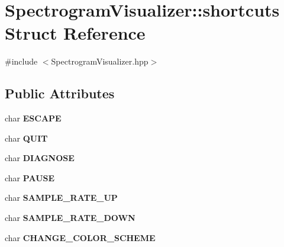 \hypertarget{structSpectrogramVisualizer_1_1shortcuts}{}\section{Spectrogram\+Visualizer\+:\+:shortcuts Struct Reference}
\label{structSpectrogramVisualizer_1_1shortcuts}


{\ttfamily \#include $<$Spectrogram\+Visualizer.\+hpp$>$}

\subsection*{Public Attributes}
\begin{DoxyCompactItemize}
\item 
\hypertarget{structSpectrogramVisualizer_1_1shortcuts_a3c916b79eb5fdbc9261962946104b26f}{}\label{structSpectrogramVisualizer_1_1shortcuts_a3c916b79eb5fdbc9261962946104b26f} 
char {\bfseries E\+S\+C\+A\+PE}
\item 
\hypertarget{structSpectrogramVisualizer_1_1shortcuts_a2ce860bc091bea9e78da24cd5691c4b4}{}\label{structSpectrogramVisualizer_1_1shortcuts_a2ce860bc091bea9e78da24cd5691c4b4} 
char {\bfseries Q\+U\+IT}
\item 
\hypertarget{structSpectrogramVisualizer_1_1shortcuts_a260568371342c5408ebb130ffa09cb33}{}\label{structSpectrogramVisualizer_1_1shortcuts_a260568371342c5408ebb130ffa09cb33} 
char {\bfseries D\+I\+A\+G\+N\+O\+SE}
\item 
\hypertarget{structSpectrogramVisualizer_1_1shortcuts_a0c36f6e4ee64ad69c86e75fb0c986c00}{}\label{structSpectrogramVisualizer_1_1shortcuts_a0c36f6e4ee64ad69c86e75fb0c986c00} 
char {\bfseries P\+A\+U\+SE}
\item 
\hypertarget{structSpectrogramVisualizer_1_1shortcuts_a19b5a234ecbb017c1dbcff99775f850a}{}\label{structSpectrogramVisualizer_1_1shortcuts_a19b5a234ecbb017c1dbcff99775f850a} 
char {\bfseries S\+A\+M\+P\+L\+E\+\_\+\+R\+A\+T\+E\+\_\+\+UP}
\item 
\hypertarget{structSpectrogramVisualizer_1_1shortcuts_addbcd297e9bd96d574b8d0f04c363c9c}{}\label{structSpectrogramVisualizer_1_1shortcuts_addbcd297e9bd96d574b8d0f04c363c9c} 
char {\bfseries S\+A\+M\+P\+L\+E\+\_\+\+R\+A\+T\+E\+\_\+\+D\+O\+WN}
\item 
\hypertarget{structSpectrogramVisualizer_1_1shortcuts_ab233bdefbc2be60b645f8096c36a6966}{}\label{structSpectrogramVisualizer_1_1shortcuts_ab233bdefbc2be60b645f8096c36a6966} 
char {\bfseries C\+H\+A\+N\+G\+E\+\_\+\+C\+O\+L\+O\+R\+\_\+\+S\+C\+H\+E\+ME}
\end{DoxyCompactItemize}


